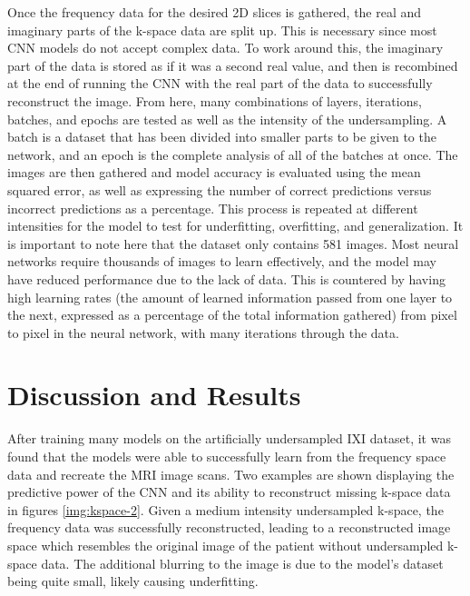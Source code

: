 \documentclass[14pt]{extreport}
\begin{document}
        Once the frequency data for the desired 2D slices is gathered, the real and imaginary parts of the k-space data are split up. This is necessary since most CNN models do not accept complex data. To work around this, the imaginary part of the data is stored as if it was a second real value, and then is recombined at the end of running the CNN with the real part of the data to successfully reconstruct the image. From here, many combinations of layers, iterations, batches, and epochs are tested as well as the intensity of the undersampling. A batch is a dataset that has been divided into smaller parts to be given to the network, and an epoch is the complete analysis of all of the batches at once. The images are then gathered and model accuracy is evaluated using the mean squared error, as well as expressing the number of correct predictions versus incorrect predictions as a percentage. This process is repeated at different intensities for the model to test for underfitting, overfitting, and generalization. It is important to note here that the dataset only contains 581 images. Most neural networks require thousands of images to learn effectively, and the model may have reduced performance due to the lack of data. This is countered by having high learning rates (the amount of learned information passed from one layer to the next, expressed as a percentage of the total information gathered) from pixel to pixel in the neural network, with many iterations through the data.

    \section*{Discussion and Results}
        After training many models on the artificially undersampled IXI dataset, it was found that the models were able to successfully learn from the frequency space data and recreate the MRI image scans. Two examples are shown displaying the predictive power of the CNN and its ability to reconstruct missing k-space data in figures \ref{img:kspace-2}. Given a medium intensity undersampled k-space, the frequency data was successfully reconstructed, leading to a reconstructed image space which resembles the original image of the patient without undersampled k-space data. The additional blurring to the image is due to the model's dataset being quite small, likely causing underfitting.
\end{document}
